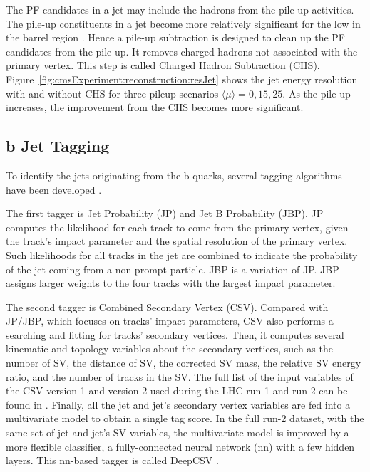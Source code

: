 The PF candidates in a jet may include the hadrons from the pile-up activities. The pile-up constituents in a jet become more relatively significant for the low \pt in the barrel region \cite{cms:particleflow:Sirunyan:2017ulk}. Hence a pile-up subtraction is designed to clean up the PF candidates from the pile-up. It removes charged hadrons not associated with the primary vertex. This step is called Charged Hadron Subtraction (CHS). Figure~\ref{fig:cmsExperiment:reconstruction:resJet} shows the jet energy resolution with and without CHS for three pileup scenarios $\langle \mu\rangle =0,15,25$. As the pile-up increases, the improvement from the CHS becomes more significant.  





\subsection{b Jet Tagging}

To identify the jets originating from the b quarks, several tagging algorithms have been developed \cite{Chatrchyan:2012jua, Sirunyan:2017ezt, Bols:2020bkb}. 

The first tagger is Jet Probability (JP) and Jet B Probability (JBP). JP computes the likelihood for each track to come from the primary vertex, given the track's impact parameter and the spatial resolution of the primary vertex. Such likelihoods for all tracks in the jet are combined to indicate the probability of the jet coming from a non-prompt particle. JBP is a variation of JP. JBP assigns larger weights to the four tracks with the largest impact parameter. 

The second tagger is Combined Secondary Vertex (CSV). Compared with JP/JBP, which focuses on tracks' impact parameters, CSV also performs a searching and fitting for tracks' secondary vertices. Then, it computes several kinematic and topology variables about the secondary vertices, such as the number of SV, the distance of SV, the corrected SV mass, the relative SV energy ratio, and the number of tracks in the SV. The full list of the input variables of the CSV version-1 and version-2 used during the LHC run-1 and run-2 can be found in \cite{Sirunyan:2017ezt}. Finally, all the jet and jet's secondary vertex variables are fed into a multivariate model to obtain a single \PQb tag score. In the full run-2 dataset, with the same set of jet and jet's SV variables, the multivariate model is improved by a more flexible classifier, a fully-connected neural network (nn) with a few hidden layers. This nn-based tagger is called DeepCSV \cite{Bols:2020bkb}.

